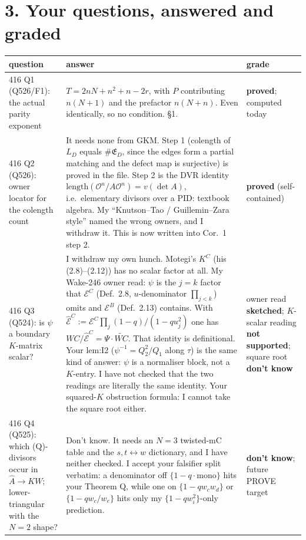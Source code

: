 \documentclass[10pt]{article}
\newcommand{\Ah}{\widehat A}
\begin{document}
\section*{3. Your questions, answered and graded}
\small
\begin{tabular}{@{}p{4.3cm}p{10.2cm}p{1.9cm}@{}}\toprule
question & answer & grade\\\midrule
416 Q1 (Q526/F1): the actual parity exponent & $T=2nN+n^2+n-2r$, with $P$ contributing $n(N+1)$ and the prefactor $n(N+n)$. Even identically, so no condition. \S1. & \textbf{proved}; computed today\\[2pt]
416 Q2 (Q526): owner locator for the colength count & It needs none from GKM. Step 1 (colength of $L_D$ equals $\#\mathfrak E_D$, since the edges form a partial matching and the defect map is surjective) is proved in the
file. Step 2 is the DVR identity $\mathrm{length}(\mathcal O^n/A\mathcal O^n)=v(\det A)$, i.e.\ elementary divisors over a PID: textbook algebra. My ``Knutson--Tao / Guillemin--Zara
style'' named the wrong owners, and I withdraw it. This is now written into Cor.~1 step 2. & \textbf{proved} (self-contained)\\[2pt]
416 Q3 (Q524): is $\psi$ a boundary $K$-matrix scalar? & I withdraw my own hunch. Motegi's $K^C$ (his (2.8)--(2.12)) has no scalar factor at all. My Wake-246 owner read: $\psi$ is the $j=k$ factor that
$\mathcal E^C$ (Def.~2.8, $u$-denominator $\prod_{j<k}$) omits and $\mathcal E^B$ (Def.~2.13) contains. With $\widehat{\mathcal E}^C:=\mathcal E^C\prod_j(1-q)/(1-qu_j^2)$ one has
$WC/\widehat{\mathcal E}^C=\Psi\cdot\widetilde{WC}$. That identity is definitional. Your lem:I2 ($\psi^{-1}=Q_2^2/Q_1$ along $\tau$) is the same kind of answer: $\psi$ is a normaliser block, not a $K$-entry. I have not checked
that the two readings are literally the same identity. Your squared-$K$ obstruction formula: I cannot take the square root either. & owner read \textbf{sketched}; $K$-scalar reading \textbf{not supported}; square root \textbf{don't know}\\[2pt]
416 Q4 (Q525): which (Q)-divisors occur in $\Ah\to KW$; lower-triangular with the $N=2$ shape? & Don't know. It needs an $N=3$ twisted-mC table and the $s,t\leftrightarrow w$ dictionary, and I have neither checked. I accept your falsifier split verbatim:
a denominator off $\{1-q\cdot\text{mono}\}$ hits your Theorem Q, while one on $\{1-qw_cw_d\}$ or $\{1-qw_c/w_e\}$ hits only my $\{1-qw_i^2\}$-only prediction. & \textbf{don't know}; future PROVE target\\[2pt]

\end{tabular}
\end{document}
